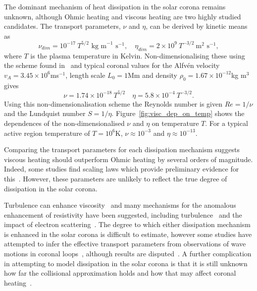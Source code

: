 The dominant mechanism of heat dissipation in the solar corona remains unknown, although Ohmic heating and viscous heating are two highly studied candidates. The transport parameters, $\nu$ and $\eta$, can be derived by kinetic means as
\begin{equation}
  \label{eq:nu_and_eta}
\nu_{dim} = 10^{-17}\ T^{5/2} \text{ kg m}^{-1}\text{ s}^{-1}, \quad \eta_{dim} = 2\times 10^{9}\ T^{-3/2}\ \text{m}^2 \text{ s}^{-1},
\end{equation}
where $T$ is the plasma temperature in Kelvin. Non-dimensionalising these using the scheme found in~\cite{arberStaggeredGridLagrangian2001} and typical coronal values for the Alfv\'en velocity $v_A = 3.45 \times 10^6$ms$^{-1}$, length scale $L_0 = 1$Mm and density $\rho_0 = 1.67 \times 10^{-12}$kg m$^3$ gives
\begin{equation}
  \label{eq:nondim_nu_and_eta}
\nu = 1.74 \times 10^{-18}\ T^{5/2} \quad \eta = 5.8 \times 10^{-4}\ T^{-3/2}.
\end{equation}
Using this non-dimensionalisation scheme the Reynolds number is given $Re = 1/\nu$ and the Lundquist number $S = 1/\eta$. Figure~\ref{fig:visc_dep_on_temp} shows the dependences of the non-dimensionalised $\nu$ and $\eta$ on temperature $T$. For a typical active region temperature of $T = 10^6$K, $\nu \approx 10^{-3}$ and $\eta \approx 10^{-13}$.

Comparing the transport parameters for each dissipation mechanism suggests viscous heating should outperform Ohmic heating by several orders of magnitude. Indeed, some studies find scaling laws which provide preliminary evidence for this~\cite{craigAnisotropicViscousDissipation2009a,craigViscousDissipation3D2013}. However, these parameters are unlikely to reflect the true degree of dissipation in the solar corona. 

Turbulence can enhance viscosity~\cite{canutoTurbulentViscosity1988} and many mechanisms for the anomalous enhancement of resistivity have been suggested, including turbulence~\cite{cheHowAnomalousResistivity2017} and the impact of electron scattering~\cite{maEffectiveResistivityCollisionless2018}. The degree to which either dissipation mechanism is enhanced in the solar corona is difficult to estimate, however some studies have attempted to infer the effective transport parameters from observations of wave motions in coronal loops~\cite{nakariakovTRACEObservationDamped1999}, although results are disputed~\cite{klimchukCoronalSeismologyPropagation2004}. A further complication in attempting to model dissipation in the solar corona is that it is still unknown how far the collisional approximation holds and how that may affect coronal heating~\cite{klimchukSolvingCoronalHeating2006a}.

